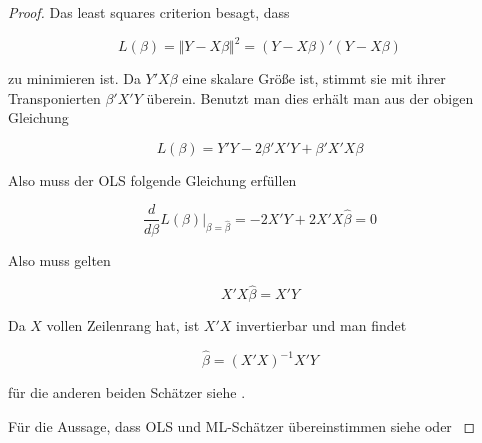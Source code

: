 \documentclass[12pt,a4paper]{article}
\theoremstyle{definition}
\theoremstyle{definition}
\theoremstyle{definition}
\begin{document}
\begin{proof}
Das least squares criterion besagt, dass 

\begin{equation*}
L(\beta)= \Vert Y - X \beta \Vert^2 = (Y - X \beta)' (Y - X \beta) 
\end{equation*}

zu minimieren ist. Da $Y'X\beta$ eine skalare Größe ist, stimmt sie mit ihrer Transponierten $\beta'X'Y$ überein. Benutzt man dies erhält man aus der obigen Gleichung

\begin{equation*}
L(\beta) = Y'Y - 2\beta'X'Y  + \beta'X'X\beta
\end{equation*}

Also muss der OLS folgende Gleichung erfüllen

\begin{equation}
\frac{d}{d \beta} L(\beta) \vert_{\beta=\hat{\beta}} = -2X'Y + 2 X'X \hat{\beta} = 0
\end{equation}

Also muss gelten

\begin{equation}
X'X \hat{\beta} = X'Y
\end{equation}

Da $X$ vollen Zeilenrang hat, ist $X'X$ invertierbar und man findet

\begin{equation*}
\hat{\beta} = (X'X)^{-1}X'Y
\end{equation*}

für die anderen beiden Schätzer siehe \cite[4]{Liu64}.

Für die Aussage, dass OLS und ML-Schätzer übereinstimmen siehe \cite[74]{Munk13} oder \cite[3]{Liu64}
\end{proof}

\end{document}
